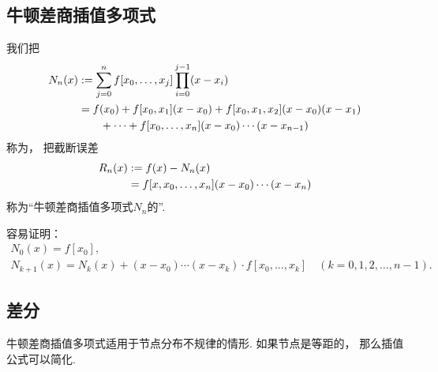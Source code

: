 \subsection{牛顿差商插值多项式}
我们把\begin{align}
	N_n(x)
	&:=
	\sum_{j=0}^n f[x_0,\dotsc,x_j] \prod_{i=0}^{j-1} (x-x_i)
		\label{equation:牛顿插值.牛顿差商插值多项式} \\
	&= f(x_0)
	+ f[x_0,x_1] (x-x_0)
	+ f[x_0,x_1,x_2] (x-x_0)(x-x_1)
		\notag \\
	&\hspace{20pt}+ \dotsb
	+ f[x_0,\dotsc,x_n] (x-x_0)\dotsm(x-x_{n-1})
		\notag
\end{align}
称为，
把截断误差\begin{align}
	R_n(x)
	&:=
	f(x) - N_n(x)
		\notag \\
	&= f[x,x_0,\dotsc,x_n] (x-x_0)\dotsm(x-x_n)
		\label{equation:牛顿插值.牛顿差商插值多项式的余项}
\end{align}
称为“牛顿差商插值多项式\(N_n\)的”.

容易证明：\begin{gather*}
	N_0(x)
	= f[x_0], \\
	N_{k+1}(x)
	= N_k(x) + (x-x_0)\dotsm(x-x_k) \cdot f[x_0,\dotsc,x_k]
	\quad(k=0,1,2,\dotsc,n-1).
\end{gather*}

\subsection{差分}
牛顿差商插值多项式适用于节点分布不规律的情形.
如果节点是等距的，
那么插值公式可以简化.

